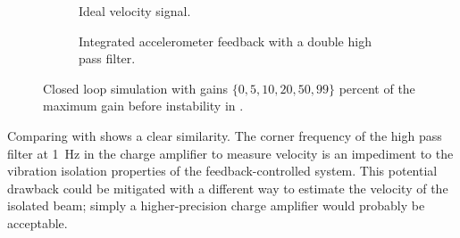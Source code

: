 \begin{figure}
  \begin{wide}
  \begin{subfigure}
    \caption{Ideal velocity signal.}
  \end{subfigure}
  \begin{subfigure}
    \caption{Integrated accelerometer feedback with a double high pass filter.}
  \end{subfigure}
  \end{wide}
  \caption{Closed loop simulation with gains $\{0, 5, 10, 20, 50, 99\}$ percent
           of the maximum gain before instability in .}
\end{figure}

Comparing  with  shows a clear similarity.
The corner frequency of the high pass filter at \SI{1}{Hz} in the charge
amplifier to measure velocity is an impediment to the vibration isolation
properties of the feedback-controlled system. This potential drawback could
be mitigated with a different way to estimate the velocity of the isolated
beam; simply a higher-precision charge amplifier would probably be acceptable.


